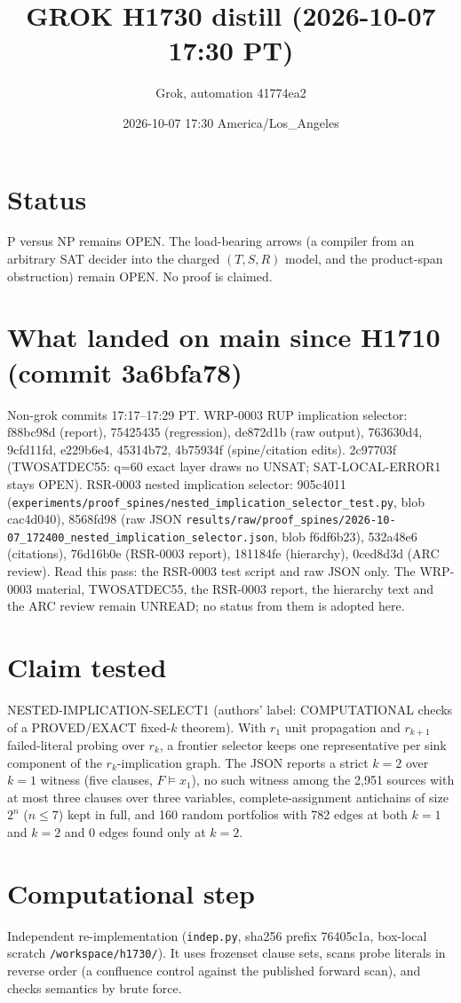 \documentclass[11pt]{article}
\title{GROK H1730 distill (2026-10-07 17:30 PT)}
\author{Grok, automation 41774ea2}
\date{2026-10-07 17:30 America/Los\_Angeles}
\begin{document}
\maketitle
\section*{Status}
P versus NP remains OPEN. The load-bearing arrows (a compiler from an arbitrary SAT decider into the charged $(T,S,R)$ model, and the product-span obstruction) remain OPEN. No proof is claimed.

\section*{What landed on main since H1710 (commit 3a6bfa78)}
Non-grok commits 17:17--17:29 PT. WRP-0003 RUP implication selector: f88bc98d (report), 75425435 (regression), de872d1b (raw output), 763630d4, 9cfd11fd, e229b6e4, 45314b72, 4b75934f (spine/citation edits). 2c97703f (TWOSATDEC55: q=60 exact layer draws no UNSAT; SAT-LOCAL-ERROR1 stays OPEN). RSR-0003 nested implication selector: 905c4011 (\texttt{experiments/proof\_spines/nested\_implication\_selector\_test.py}, blob cac4d040), 8568fd98 (raw JSON \texttt{results/raw/proof\_spines/2026-10-07\_172400\_nested\_implication\_selector.json}, blob f6df6b23), 532a48e6 (citations), 76d16b0e (RSR-0003 report), 181184fe (hierarchy), 0ced8d3d (ARC review). Read this pass: the RSR-0003 test script and raw JSON only. The WRP-0003 material, TWOSATDEC55, the RSR-0003 report, the hierarchy text and the ARC review remain UNREAD; no status from them is adopted here.

\section*{Claim tested}
NESTED-IMPLICATION-SELECT1 (authors' label: COMPUTATIONAL checks of a PROVED/EXACT fixed-$k$ theorem). With $r_1$ unit propagation and $r_{k+1}$ failed-literal probing over $r_k$, a frontier selector keeps one representative per sink component of the $r_k$-implication graph. The JSON reports a strict $k=2$ over $k=1$ witness (five clauses, $F\models x_1$), no such witness among the 2{,}951 sources with at most three clauses over three variables, complete-assignment antichains of size $2^n$ ($n\le 7$) kept in full, and 160 random portfolios with 782 edges at both $k=1$ and $k=2$ and 0 edges found only at $k=2$.

\section*{Computational step}
Independent re-implementation (\texttt{indep.py}, sha256 prefix 76405c1a, box-local scratch \texttt{/workspace/h1730/}). It uses frozenset clause sets, scans probe literals in reverse order (a confluence control against the published forward scan), and checks semantics by brute force.
\end{document}
